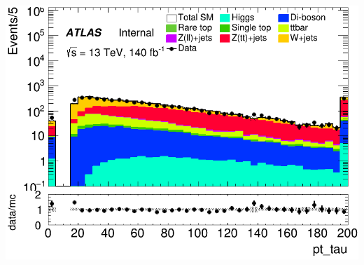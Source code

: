 \documentclass[usenames,dvipsnames]{beamer}
\begin{document}
\begin{frame}
\begin{minipage}{0.32\textwidth}
        \includegraphics[width=\textwidth]{graphics/H_met/H_met_pt_tau.png}
    \end{minipage}
    
    \vspace{0.5cm} %

\end{frame}
\end{document}
